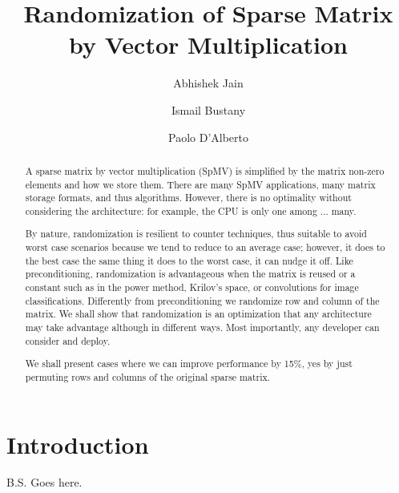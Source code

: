 \documentclass[manuscript,screen]{acmart}
\begin{document}
\title{Randomization of Sparse Matrix by Vector Multiplication }

\author{Abhishek Jain}
\author{Ismail Bustany}
\author{Paolo D'Alberto}


\renewcommand{\shortauthors}{Jain et al.}

\begin{abstract}
A sparse matrix by vector multiplication (SpMV) is simplified by the
matrix non-zero elements and how we store them. There are many SpMV
applications, many matrix storage formats, and thus
algorithms. However, there is no optimality without considering the
architecture: for example, the CPU is only one among ... many.

By nature, randomization is resilient to counter techniques, thus
suitable to avoid worst case scenarios because we tend to reduce to an
average case; however, it does to the best case the same thing it does
to the worst case, it can nudge it off. Like preconditioning,
randomization is advantageous when the matrix is reused or a constant
such as in the power method, Krilov's space, or convolutions for image
classifications. Differently from preconditioning we randomize row and
column of the matrix. We shall show that randomization is an
optimization that any architecture may take advantage although in
different ways. Most importantly, any developer can consider and
deploy.

We shall present cases where we can improve performance by 15\%, yes
by just permuting rows and columns of the original sparse matrix.

\end{abstract}

\maketitle

\section{Introduction} B.S. Goes here.
\label{sec:introduction}
\end{document}
